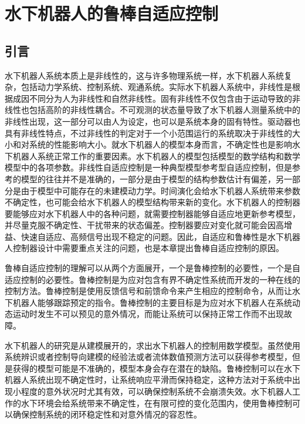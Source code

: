 


\chapter{水下机器人的鲁棒自适应控制}

\label{chap:robust_adaptive}


\section{引言 }
水下机器人系统本质上是非线性的，这与许多物理系统一样，水下机器人系统复杂，包括动力学系统、控制系统、观通系统。实际水下机器人系统中，非线性是根据成因不同分为人为非线性和自然非线性。固有非线性不仅包含由于运动导致的非线性也包括高阶的非线性耦合。不可观测的状态量导致了水下机器人测量系统中的非线性出现，这一部分可以由人为设定，也可以是系统本身的固有特性。驱动器也具有非线性特点，不过非线性的判定对于一个小范围运行的系统取决于非线性的大小和对系统的性能影响大小。就水下机器人的模型本身而言，不确定性也是影响水下机器人系统正常工作的重要因素。水下机器人的模型包括模型的数学结构和数学模型中的各项参数。非线性自适应控制是一种典型模型参考型自适应控制，但是参考的模型的往往并不是准确的，一部分是由于模型的结构参数估计有偏差，另一部分是由于模型中可能存在的未建模动力学。时间演化会给水下机器人系统带来参数不确定性，也可能会给水下机器人的模型结构带来新的变化。水下机器人的控制器要能够应对水下机器人中的各种问题，就需要控制器能够自适应地更新参考模型，并尽量克服不确定性、干扰带来的状态偏差。控制器要应对变化就可能会因高增益、快速自适应、高频信号出现不稳定的问题。因此，自适应和鲁棒性是水下机器人控制器设计中需要重点关注的问题，也是本章提出鲁棒自适应控制的原因。

鲁棒自适应控制的理解可以从两个方面展开，一个是鲁棒控制的必要性，一个是自适应控制的必要性。鲁棒控制是为应对包含有界不确定性系统而开发的一种在线的控制方法。鲁棒控制是使用反馈信号和前馈命令来产生相应的控制命令，从而让水下机器人能够跟踪预定的指令。鲁棒控制的主要目标是为应对水下机器人在系统动态运动时发生不可以预见的意外情况，而能让系统可以保持正常工作而不出现故障。

水下机器人的研究是从建模展开的，求出水下机器人的控制用数学模型。虽然使用系统辨识或者控制导向建模的经验法或者流体数值预测方法可以获得参考模型，但是获得的模型可能是不准确的，模型本身会存在潜在的缺陷。鲁棒控制可以在水下机器人系统出现不确定性时，让系统响应平滑而保持稳定，这种方法对于系统中出现小程度的意外状况时尤其有效，可以确保控制系统不会崩溃失效。水下机器人工作的水下环境会给系统带来不确定性，在有限可控的变化范围内，使用鲁棒控制可以确保控制系统的闭环稳定性和对意外情况的容忍性。


